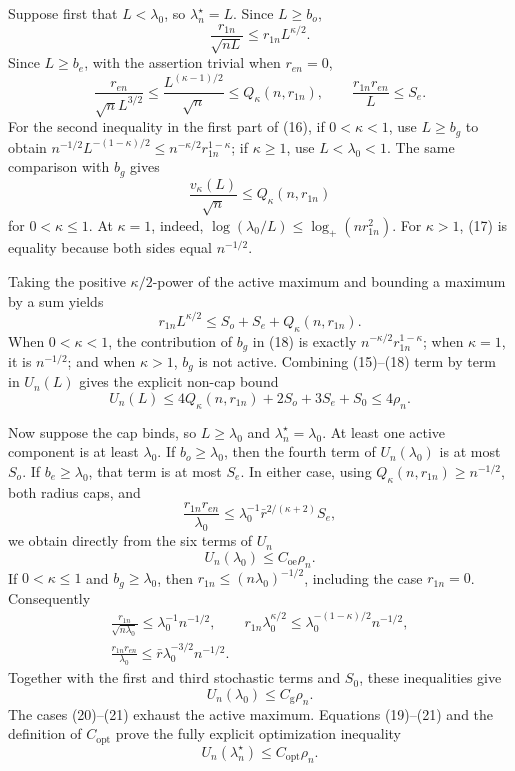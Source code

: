 Suppose first that \(L<\lambda_0\), so
\(\lambda_n^\star=L\).  Since \(L\geq b_o\),
\[
\frac{r_{1n}}{\sqrt{nL}}
\leq r_{1n}L^{\kappa/2}.                                           \tag{15}
\]
Since \(L\geq b_e\), with the assertion trivial when \(r_{en}=0\),
\[
\frac{r_{en}}{\sqrt nL^{3/2}}
\leq\frac{L^{(\kappa-1)/2}}{\sqrt n}
\leq Q_\kappa(n,r_{1n}),
\qquad
\frac{r_{1n}r_{en}}L\leq S_e.                                     \tag{16}
\]
For the second inequality in the first part of (16), if \(0<\kappa<1\),
use \(L\geq b_g\) to obtain
\(n^{-1/2}L^{-(1-\kappa)/2}
\leq n^{-\kappa/2}r_{1n}^{1-\kappa}\); if \(\kappa\geq1\), use
\(L<\lambda_0<1\).  The same comparison with \(b_g\) gives
\[
\frac{v_\kappa(L)}{\sqrt n}\leq Q_\kappa(n,r_{1n})                 \tag{17}
\]
for \(0<\kappa\leq1\).  At \(\kappa=1\), indeed,
\(\log(\lambda_0/L)\leq\log_+(nr_{1n}^2)\).  For \(\kappa>1\),
(17) is equality because both sides equal \(n^{-1/2}\).

Taking the positive \(\kappa/2\)-power of the active maximum and bounding a
maximum by a sum yields
\[
r_{1n}L^{\kappa/2}
\leq S_o+S_e+Q_\kappa(n,r_{1n}).                                    \tag{18}
\]
When \(0<\kappa<1\), the contribution of \(b_g\) in (18) is exactly
\(n^{-\kappa/2}r_{1n}^{1-\kappa}\); when \(\kappa=1\), it is
\(n^{-1/2}\); and when \(\kappa>1\), \(b_g\) is not active.  Combining
(15)--(18) term by term in \(U_n(L)\) gives the explicit non-cap bound
\[
U_n(L)\leq4Q_\kappa(n,r_{1n})+2S_o+3S_e+S_0
\leq4\rho_n.                                                       \tag{19}
\]

Now suppose the cap binds, so \(L\geq\lambda_0\) and
\(\lambda_n^\star=\lambda_0\).  At least one active component is at least
\(\lambda_0\).  If \(b_o\geq\lambda_0\), then the fourth term of
\(U_n(\lambda_0)\) is at most \(S_o\).  If
\(b_e\geq\lambda_0\), that term is at most \(S_e\).  In either case,
using \(Q_\kappa(n,r_{1n})\geq n^{-1/2}\), both radius caps, and
\[
\frac{r_{1n}r_{en}}{\lambda_0}
\leq\lambda_0^{-1}\bar r^{2/(\kappa+2)}S_e,
\]
we obtain directly from the six terms of \(U_n\)
\[
U_n(\lambda_0)\leq C_{\mathrm{oe}}\rho_n.                           \tag{20}
\]
If \(0<\kappa\leq1\) and \(b_g\geq\lambda_0\), then
\(r_{1n}\leq(n\lambda_0)^{-1/2}\), including the case \(r_{1n}=0\).
Consequently
\[
\begin{gathered}
\frac{r_{1n}}{\sqrt{n\lambda_0}}
\leq\lambda_0^{-1}n^{-1/2},\qquad
r_{1n}\lambda_0^{\kappa/2}
\leq\lambda_0^{-(1-\kappa)/2}n^{-1/2},\\
\frac{r_{1n}r_{en}}{\lambda_0}
\leq\bar r\lambda_0^{-3/2}n^{-1/2}.
\end{gathered}
\]
Together with the first and third stochastic terms and \(S_0\), these
inequalities give
\[
U_n(\lambda_0)\leq C_{\mathrm g}\rho_n.                            \tag{21}
\]
The cases (20)--(21) exhaust the active maximum.  Equations (19)--(21) and the
definition of \(C_{\mathrm{opt}}\) prove the fully explicit optimization
inequality
\[
U_n(\lambda_n^\star)\leq C_{\mathrm{opt}}\rho_n.                    \tag{22}
\]

